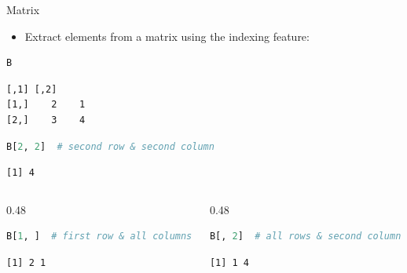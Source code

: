 \begin{frame}[fragile]{Matrix}
\begin{itemize}
  \item Extract elements from a matrix using the indexing feature:
\end{itemize}
\begin{lstlisting}[language=R]
B
\end{lstlisting}
\begin{lstlisting}[style=output]
     [,1] [,2]
[1,]    2    1
[2,]    3    4
\end{lstlisting}
\begin{lstlisting}[language=R]
B[2, 2]  # second row & second column
\end{lstlisting}
\begin{lstlisting}[style=output]
[1] 4
\end{lstlisting}
\begin{columns}[T]
\begin{column}{0.48\textwidth}
\begin{lstlisting}[language=R]
B[1, ]  # first row & all columns
\end{lstlisting}
\begin{lstlisting}[style=output]
[1] 2 1
\end{lstlisting}
\end{column}
\begin{column}{0.48\textwidth}
\begin{lstlisting}[language=R]
B[, 2]  # all rows & second column
\end{lstlisting}
\begin{lstlisting}[style=output]
[1] 1 4
\end{lstlisting}
\end{column}
\end{columns}
\end{frame}

